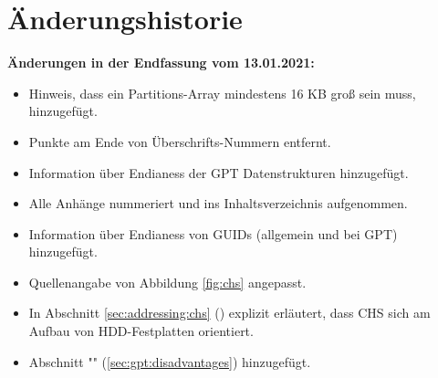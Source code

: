 \section{Änderungshistorie}

\textbf{Änderungen in der Endfassung vom 13.01.2021:}

\begin{itemize}
    \item Hinweis, dass ein Partitions-Array mindestens 16 KB groß sein muss, hinzugefügt.

    \item Punkte am Ende von Überschrifts-Nummern entfernt.

    \item Information über Endianess der GPT Datenstrukturen hinzugefügt.
    
    \item Alle Anhänge nummeriert und ins Inhaltsverzeichnis aufgenommen.
    
    \item Information über Endianess von GUIDs (allgemein und bei GPT) hinzugefügt.
    
    \item Quellenangabe von Abbildung \ref{fig:chs} angepasst.
    
    \item In Abschnitt \ref{sec:addressing:chs} () explizit erläutert, dass CHS sich am Aufbau von HDD-Festplatten orientiert.
    
    \item Abschnitt "" (\ref{sec:gpt:disadvantages}) hinzugefügt.
\end{itemize}
